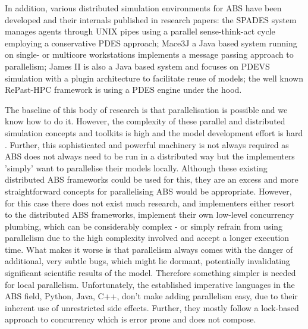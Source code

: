 In addition, various distributed simulation environments for ABS have been developed and their internals published in research papers: the SPADES system \cite{riley_next_2003} manages agents through UNIX pipes using a parallel sense-think-act cycle employing a conservative PDES approach; Mace3J \cite{gasser_mace3j:_2002} a Java based system running on single- or multicore workstations implements a message passing approach to parallelism; James II \cite{himmelspach_plugn_2007} is also a Java based system and focuses on PDEVS simulation with a plugin architecture to facilitate reuse of models; the well known RePast-HPC \cite{minson_distributing_2008, gorur_repast_2016} framework is using a PDES engine under the hood. 

The baseline of this body of research is that parallelisation is possible and we know how to do it. However, the complexity of these parallel and distributed simulation concepts and toolkits is high and the model development effort is hard \cite{abar_agent_2017}. Further, this sophisticated and powerful machinery is not always required as ABS does not always need to be run in a distributed way but the implementers 'simply' want to parallelise their models locally. Although these existing distributed ABS frameworks could be used for this, they are an excess and more straightforward concepts for parallelising ABS would be appropriate. However, for this case there does not exist much research, and implementers either resort to the distributed ABS frameworks, implement their own low-level concurrency plumbing, which can be considerably complex - or simply refrain from using parallelism due to the high complexity involved and accept a longer execution time. What makes it worse is that parallelism always comes with the danger of additional, very subtle bugs, which might lie dormant, potentially invalidating significant scientific results of the model. Therefore something simpler is needed for local parallelism. Unfortunately, the established imperative languages in the ABS field, Python, Java, C++, don't make adding parallelism easy, due to their inherent use of unrestricted side effects. Further, they mostly follow a lock-based approach to concurrency which is error prone and does not compose. %

\medskip

